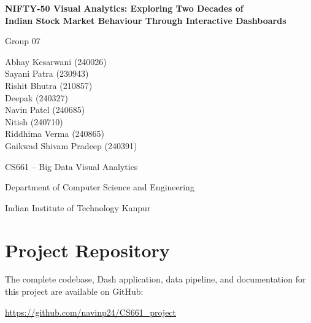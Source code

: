 \documentclass[14pt,a4paper]{extreport}
\newcommand{\groupnumber}{07}
\begin{document}
\begin{titlepage}
    \centering
    \vspace*{2cm}

    {\Large \bfseries NIFTY-50 Visual Analytics: Exploring Two Decades of \\[2mm]
    Indian Stock Market Behaviour Through Interactive Dashboards \par}

    \vspace{1.5cm}
    {\large Group \groupnumber \par}

    \vspace{0.5cm}
    {\normalsize
    Abhay Kesarwani (240026) \\
    Sayani Patra (230943) \\
    Rishit Bhutra (210857) \\
    Deepak (240327) \\
    Navin Patel (240685) \\
    Nitish (240710) \\
    Riddhima Verma (240865) \\
    Gaikwad Shivam Pradeep (240391)
    \par}

    \vspace{1.5cm}
    {\normalsize CS661 -- Big Data Visual Analytics \par}
    {\normalsize Department of Computer Science and Engineering \par}
    {\normalsize Indian Institute of Technology Kanpur \par}
\end{titlepage}

\tableofcontents

\chapter{Project Repository}

The complete codebase, Dash application, data pipeline, and documentation for
this project are available on GitHub:

\begin{center}
    \url{https://github.com/navinp24/CS661_project}
\end{center}
\end{document}
